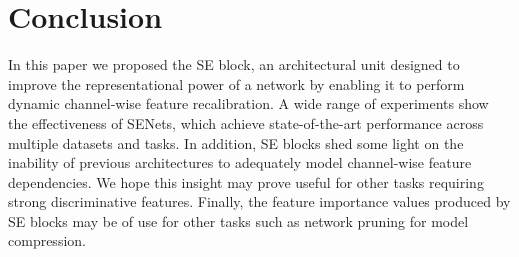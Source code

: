 \section{Conclusion}

In this paper we proposed the SE block, an architectural unit designed to improve the representational power of a network by enabling it to perform dynamic channel-wise feature recalibration. A wide range of experiments show the effectiveness of SENets, which achieve state-of-the-art performance across multiple datasets and tasks. In addition, SE blocks shed some light on the inability of previous architectures to adequately model channel-wise feature dependencies. We hope this insight may prove useful for other tasks requiring strong discriminative features. Finally, the feature importance values produced by SE blocks may be of use for other tasks such as network pruning for model compression.